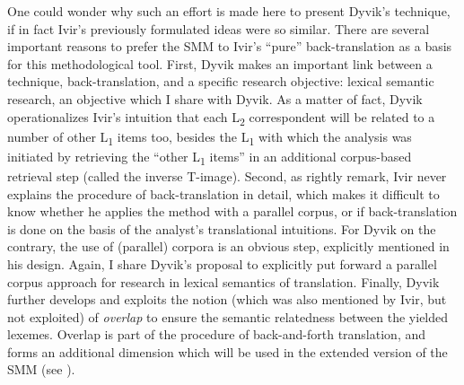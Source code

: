 One could wonder why such an effort is made here to present Dyvik’s technique, if in fact Ivir’s previously formulated ideas were so similar. There are several important reasons to prefer the SMM to Ivir’s ``pure'' back-translation as a basis for this methodological tool. First, Dyvik makes an important link between a technique, back-translation, and a specific research objective: lexical semantic research, an objective which I share with Dyvik. As a matter of fact, Dyvik operationalizes Ivir’s intuition that each L\textsubscript{2} correspondent will be related to a number of other L\textsubscript{1} items too, besides the L\textsubscript{1} with which the analysis was initiated \citep[478]{dirven_functionalism_1987} by retrieving the “other L\textsubscript{1} items” in an additional corpus-based retrieval step (called the inverse T-image). Second, as \citet[25]{ebeling_patterns_2013} rightly remark, Ivir never explains the procedure of back-translation in detail, which makes it difficult to know whether he applies the method with a parallel corpus, or if back-translation is done on the basis of the analyst’s translational intuitions. For Dyvik on the contrary, the use of (parallel) corpora is an obvious step, explicitly mentioned in his design. Again, I share Dyvik’s proposal to explicitly put forward a parallel corpus approach for research in lexical semantics of translation. Finally, Dyvik further develops and exploits the notion (which was also mentioned by Ivir, but not exploited) of \textit{overlap} to ensure the semantic relatedness between the yielded lexemes. Overlap is part of the procedure of back-and-forth translation, and forms an additional dimension which will be used in the extended version of the SMM (see ).

